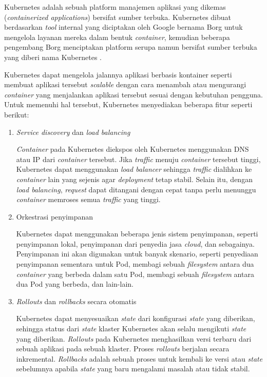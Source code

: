 Kubernetes adalah sebuah platform manajemen aplikasi yang dikemas (\emph{containerized applications})
bersifat sumber terbuka. Kubernetes dibuat berdasarkan \emph{tool} internal yang
diciptakan oleh Google bernama Borg untuk mengelola layanan mereka dalam bentuk \emph{container},
kemudian beberapa pengembang Borg menciptakan platform serupa
namun bersifat sumber terbuka yang diberi nama Kubernetes \parencite{borg-references}.

Kubernetes dapat mengelola jalannya aplikasi berbasis kontainer seperti membuat
aplikasi tersebut \emph{scalable} dengan cara menambah atau mengurangi \emph{container}
yang menjalankan aplikasi tersebut sesuai dengan kebutuhan pengguna. Untuk memenuhi
hal tersebut, Kubernetes menyediakan beberapa fitur seperti berikut:

\begin{enumerate}

  \item \emph{Service discovery} dan \emph{load balancing}

    \emph{Container} pada Kubernetes diekspos oleh Kubernetes menggunakan DNS atau IP dari
    \emph{container} tersebut. Jika \emph{traffic} menuju \emph{container} tersebut tinggi, Kubernetes
    dapat menggunakan \emph{load balancer} sehingga \emph{traffic} dialihkan ke \emph{container} lain yang sejenis
    agar \emph{deployment} tetap stabil. Selain itu, dengan \emph{load balancing}, \emph{request} dapat ditangani
    dengan cepat tanpa perlu menunggu \emph{container} memroses semua \emph{traffic}
    yang tinggi.

  \item{Orkestrasi penyimpanan}

    Kubernetes dapat menggunakan beberapa jenis sistem penyimpanan, seperti
    penyimpanan lokal, penyimpanan dari penyedia jasa \emph{cloud}, dan sebagainya.
    Penyimpanan ini akan digunakan untuk banyak skenario, seperti penyediaan penyimpanan
    sementara untuk Pod, membagi sebuah \emph{filesystem} antara dua \emph{container}
    yang berbeda dalam satu Pod, membagi sebuah \emph{filesystem} antara dua Pod yang
    berbeda, dan lain-lain.

  \item \emph{Rollouts} dan \emph{rollbacks} secara otomatis

    Kubernetes dapat menyesuaikan \emph{state} dari konfigurasi \emph{state} yang
    diberikan, sehingga status dari \emph{state} klaster Kubernetes akan selalu mengikuti
    \emph{state} yang diberikan. \emph{Rollouts} pada Kubernetes menghasilkan versi terbaru
    dari sebuah aplikasi pada sebuah klaster. Proses \emph{rollouts} berjalan secara inkremental.
    \emph{Rollbacks} adalah sebuah proses untuk kembali ke versi atau \emph{state} sebelumnya apabila
    \emph{state} yang baru mengalami masalah atau tidak stabil.
    


\end{enumerate}
